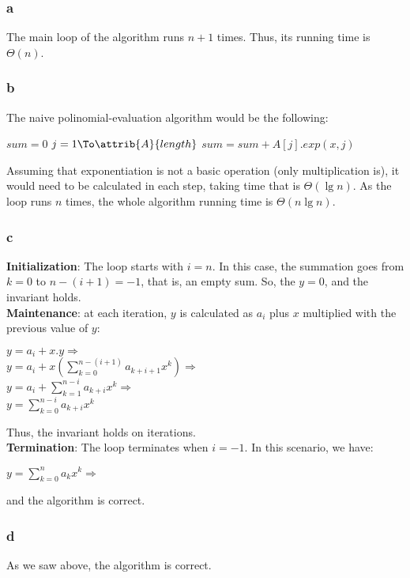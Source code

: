 \documentclass[8pt,a4paper]{article}
\begin{document}
\subsubsection*{a}

The main loop of the algorithm runs $n + 1$ times. Thus, its running time
is $\Theta(n)$.

\subsubsection*{b}

The naive polinomial-evaluation algorithm would be the following:

\begin{codebox}
  \li $sum = 0$
  \li \For $j = 1 \To \attrib{A}{length}$
        \Do
  \li     $sum = sum + A[j] . exp(x, j)$
        \End
\end{codebox}

Assuming that exponentiation is not a basic operation (only multiplication is),
it would need to be calculated in each step, taking time that is $\Theta(\lg n)$.
As the loop runs $n$ times, the whole algorithm running time is $\Theta(n \lg n)$.

\subsubsection*{c}

\textbf{Initialization}: The loop starts with $i = n$. In this case, the summation
goes from $k = 0$ to $n - (i + 1) = -1$, that is, an empty sum. So, the $y = 0$,
and the invariant holds. \\

\textbf{Maintenance}: at each iteration, $y$ is calculated as $a_i$ plus $x$
multiplied with the previous value of $y$:

\begin{center}
  $y = a_i + x . y \Rightarrow$ \\
  $y = a_i + x (\sum\limits_{k = 0}^{n-(i+1)} a_{k+i+1} x^k) \Rightarrow$ \\
  $y = a_i + \sum\limits_{k = 1}^{n - i} a_{k+i} x^k \Rightarrow$ \\
  $y = \sum\limits_{k = 0}^{n-i} a_{k+i} x^k$
\end{center}

Thus, the invariant holds on iterations. \\

\textbf{Termination}: The loop terminates when $i = -1$. In this scenario, we have:

\begin{center}
  $y = \sum_{k = 0}^{n} a_k x^k \Rightarrow$
\end{center}

and the algorithm is correct.

\subsubsection*{d}

As we saw above, the algorithm is correct.
\end{document}
